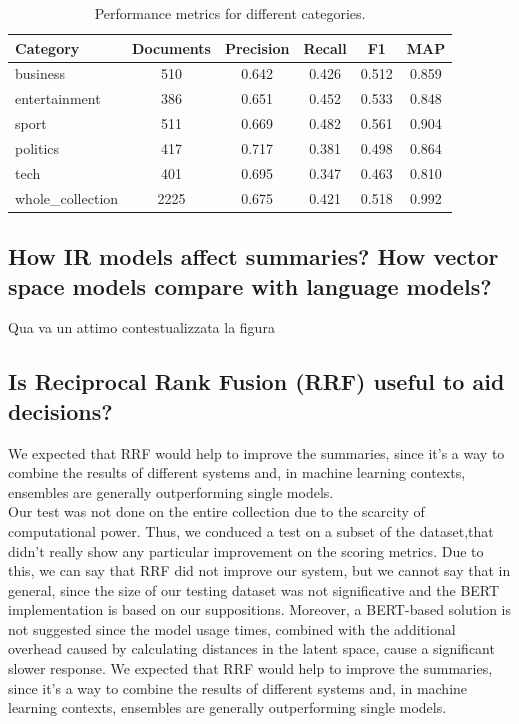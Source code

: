\begin{center}
    \begin{table}[H]
        \centering
        \begin{tabular}{|l|c|c|c|c|c|}
            \hline
            Category          & Documents & Precision & Recall & F1    & MAP   \\
            \hline
            business          & 510       & 0.642     & 0.426  & 0.512 & 0.859 \\
            entertainment     & 386       & 0.651     & 0.452  & 0.533 & 0.848 \\
            sport             & 511       & 0.669     & 0.482  & 0.561 & 0.904 \\
            politics          & 417       & 0.717     & 0.381  & 0.498 & 0.864 \\
            tech              & 401       & 0.695     & 0.347  & 0.463 & 0.810 \\
            \hline
            whole\_collection & 2225      & 0.675     & 0.421  & 0.518 & 0.992 \\
            \hline
        \end{tabular}
        \caption{Performance metrics for different categories.}
        \label{tab:performance}
    \end{table}
\end{center}

\subsection{How IR models affect summaries? How vector space models compare with language models?}
Qua va un attimo contestualizzata la figura
\subsection{Is Reciprocal Rank Fusion (RRF) useful to aid decisions?}
We expected that RRF would help to improve the summaries, since it's a way to combine the results of different systems and, in machine learning contexts, ensembles are generally outperforming single models. \\
Our test was not done on the entire collection due to the scarcity of computational power. Thus, we conduced a test on a subset of the dataset,that didn't really show any particular improvement on the scoring metrics. Due to this, we can say that RRF did not improve our system, but we cannot say that in general, since the size of our testing dataset was not significative and the BERT implementation is based on our suppositions. 
Moreover, a BERT-based solution is not suggested since the model usage times, combined with the additional overhead caused by calculating distances in the latent space, cause a significant slower response.
We expected that RRF would help to improve the summaries, since it's a way to
combine the results of different systems and, in machine learning contexts,
ensembles are generally outperforming single models.

